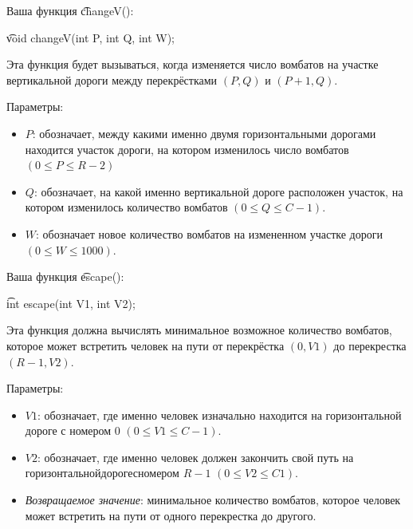 Ваша функция \t{changeV()}:

\t{void changeV(int P, int Q, int W);}        


Эта функция будет вызываться, когда изменяется число вомбатов на участке вертикальной дороги между перекрёстками $(P, Q)$ и $(P + 1, Q)$.

Параметры:
\begin{itemize}
\item $P$: обозначает, между какими именно двумя горизонтальными дорогами находится участок дороги, на котором изменилось число вомбатов $( 0 \leq P \leq R -­ 2 )$
\item $Q$: обозначает, на какой именно вертикальной дороге расположен участок, на котором изменилось количество вомбатов $( 0 \leq Q \leq C - 1 )$.
\item $W$: обозначает новое количество вомбатов на измененном участке дороги $( 0 \leq W \leq 1 000 )$.
\end{itemize}



Ваша функция \t{escape()}:

\t{int escape(int V1, int V2);}


Эта функция должна вычислять минимальное возможное количество вомбатов, которое может встретить человек на пути от перекрёстка $(0, V1)$ до перекрестка
$(R - 1, V2)$. 

Параметры:
\begin{itemize}
\item $V1$: обозначает, где именно человек изначально находится на горизонтальной дороге с номером $0$ $( 0 \leq V1 \leq C - 1 )$.
\item $V2$: обозначает, где именно человек должен закончить свой путь на горизонтальнойдорогесномером $R­-1$ $(0\leq V2\leq C­1)$.
\item \textit{Возвращаемое значение}: минимальное количество вомбатов, которое человек может встретить на пути от одного перекрестка до другого.
\end{itemize}
